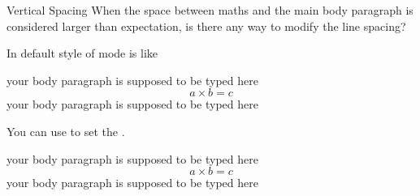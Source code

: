 \begin{frame}[fragile]{Vertical Spacing}
    When the space between  maths and the main body paragraph is considered larger than expectation, is there any way to modify the line spacing? \medskip
    
    In default style of  mode is like

\begin{latexexample}
your body paragraph is supposed to be typed here
\begin{equation}
  a \times b = c 
\end{equation}
your body paragraph is supposed to be typed here
\end{latexexample}

\end{frame}

\begin{frame}[fragile]
You can use \LC{\setlength} to set the . \medskip
	
\begin{command}
\begin{LCL}
\setlength{}
\setlength{}
\end{LCL}
\end{command}

\begin{latexexample}
\setlength\abovedisplayskip{0em}
\setlength\belowdisplayskip{0em}
your body paragraph is supposed to be typed here
\begin{equation}
  a \times b = c 
\end{equation}
your body paragraph is supposed to be typed here
\end{latexexample}

\end{frame}




